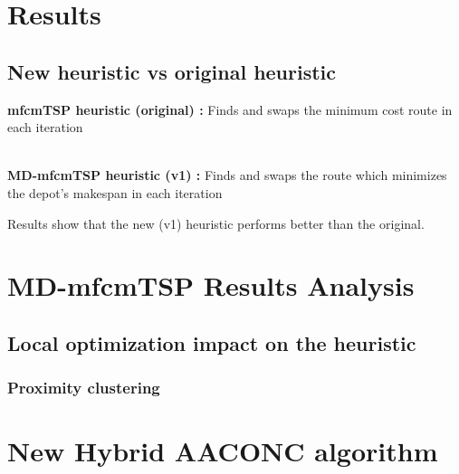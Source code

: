 \documentclass{article}
\begin{document}
	\section{Results}
	\subsection{New heuristic vs original heuristic}
	\textbf{mfcmTSP heuristic (original) : } Finds and swaps the minimum cost route in each iteration \\ \;
	\\
	\par
	\textbf{MD-mfcmTSP heuristic (v1) : } Finds and swaps the route which minimizes the depot's makespan in each iteration \\ \;
	\par 
	Results show that the new (v1) heuristic performs better than the original.
	\;
	\;
	

	
	
	\clearpage
	\section{MD-mfcmTSP Results Analysis}
	\subsection{Local optimization impact on the heuristic}
	\subsubsection{Proximity clustering}
	\;
	\clearpage
	\section{New Hybrid AACONC algorithm}
	\;
\end{document}
